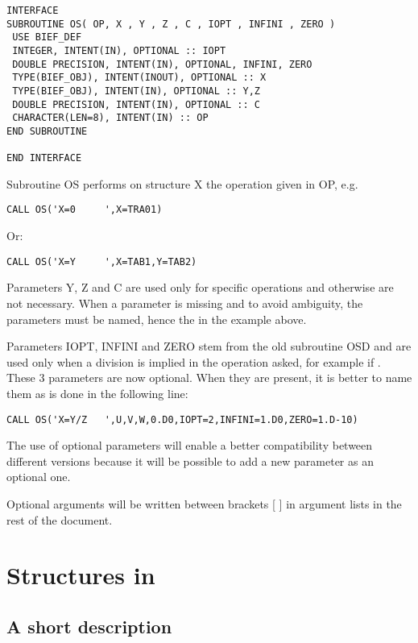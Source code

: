 \begin{lstlisting}[language=TelFortran]
INTERFACE
SUBROUTINE OS( OP, X , Y , Z , C , IOPT , INFINI , ZERO )
 USE BIEF_DEF
 INTEGER, INTENT(IN), OPTIONAL :: IOPT
 DOUBLE PRECISION, INTENT(IN), OPTIONAL, INFINI, ZERO
 TYPE(BIEF_OBJ), INTENT(INOUT), OPTIONAL :: X
 TYPE(BIEF_OBJ), INTENT(IN), OPTIONAL :: Y,Z
 DOUBLE PRECISION, INTENT(IN), OPTIONAL :: C
 CHARACTER(LEN=8), INTENT(IN) :: OP
END SUBROUTINE

END INTERFACE
\end{lstlisting}

Subroutine OS performs on structure X the operation given in OP, e.g.

\begin{lstlisting}[language=TelFortran]
CALL OS('X=0     ',X=TRA01)
\end{lstlisting}
Or:

\begin{lstlisting}[language=TelFortran]
CALL OS('X=Y     ',X=TAB1,Y=TAB2)
\end{lstlisting}
Parameters Y, Z and C are used only for specific operations and otherwise are
not necessary. When a parameter is missing and to avoid ambiguity, the
parameters must be named, hence the  in the example above.

Parameters IOPT, INFINI and ZERO stem from the old subroutine OSD and are used
only when a division is implied in the operation asked, for example if . These 3 parameters are now optional. When they are present, it is
better to name them as is done in the following line:

\begin{lstlisting}[language=TelFortran]
CALL OS('X=Y/Z   ',U,V,W,0.D0,IOPT=2,INFINI=1.D0,ZERO=1.D-10)
\end{lstlisting}

The use of optional parameters will enable a better compatibility between
different versions because it will be possible to add a new parameter as an
optional one.

Optional arguments will be written between brackets [ ] in argument lists in the
rest of the document.
%
\section{Structures in \bief}
%

\subsection{A short description}

